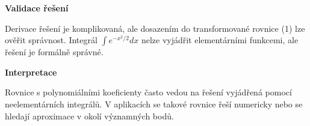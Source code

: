 \begin{example}
    \vspace{1.5\baselineskip}
    
    \noindent\textbf{Validace řešení}
    
    Derivace řešení je komplikovaná, ale dosazením do transformované rovnice (1) lze ověřit správnost. Integrál $\int e^{-x^2/2}dx$ nelze vyjádřit elementárními funkcemi, ale řešení je formálně správné.
    
    \vspace{1.5\baselineskip}
    
    \noindent\textbf{Interpretace}
    
    Rovnice s polynomiálními koeficienty často vedou na řešení vyjádřená pomocí neelementárních integrálů. V aplikacích se takové rovnice řeší numericky nebo se hledají aproximace v okolí významných bodů.
    
    \end{example}
    
    \vspace{2\baselineskip}
    
